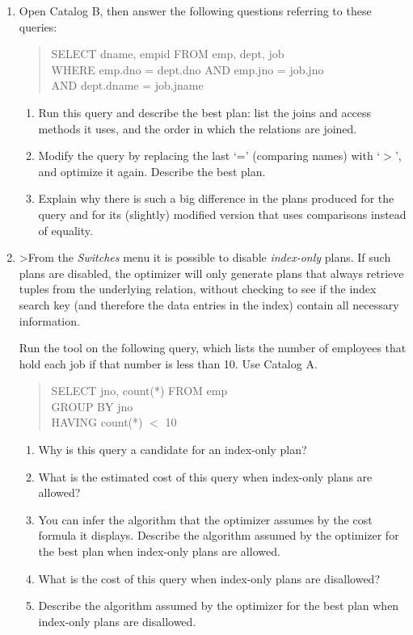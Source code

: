 \begin{enumerate}
{end eat
}


\item

Open Catalog B, then answer the following questions referring to these
queries:
\begin{quote}
     SELECT dname, empid FROM emp, dept, job\\
     WHERE emp.dno = dept.dno AND emp.jno = job.jno\\
             AND dept.dname = job.jname
\end{quote}
\begin{enumerate}
\item
Run this query and describe the best plan: list the joins and access methods
it uses, and the order in which the relations are joined.
\item
Modify the query by replacing the last `=' (comparing names) with `$>$', and
optimize it again.  Describe the best plan.
\item
Explain why there is such a big difference in the plans produced for the query
and for its (slightly) modified version that uses comparisons instead of
equality.
\end{enumerate}


\item

>From the {\em Switches} menu it is possible to disable {\em index-only} plans.  
If such plans are disabled, the optimizer will only generate plans that
always retrieve tuples from the underlying relation, without checking to
see if the index search key (and therefore the data entries in the index)
contain all necessary information.

Run the tool on the following query, which lists the number of employees that
hold each job if that number is less than 10.  Use Catalog A.
\begin{quote}
	SELECT jno, count(*) FROM emp\\
	GROUP BY jno\\
	HAVING count(*) $<$ 10
\end{quote}

\begin{enumerate}
\item
Why is this query a candidate for an index-only plan?
\item
What is the estimated cost of this query when index-only plans are allowed?
\item
You can infer the algorithm that the optimizer assumes by the cost
formula it displays.  Describe the algorithm assumed by the optimizer for
the best plan when index-only plans are allowed.
\item
What is the cost of this query when index-only plans are disallowed?
\item
Describe the algorithm assumed by the optimizer for the best plan when
index-only plans are disallowed.
\end{enumerate}



\end{enumerate}
